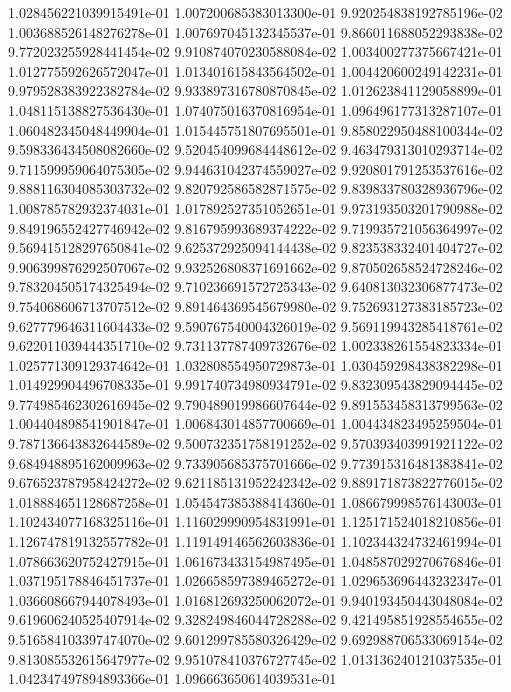 1.028456221039915491e-01
1.007200685383013300e-01
9.920254838192785196e-02
1.003688526148276278e-01
1.007697045132345537e-01
9.866011688052293838e-02
9.772023255928441454e-02
9.910874070230588084e-02
1.003400277375667421e-01
1.012775592626572047e-01
1.013401615843564502e-01
1.004420600249142231e-01
9.979528383922382784e-02
9.933897316780870845e-02
1.012623841129058899e-01
1.048115138827536430e-01
1.074075016370816954e-01
1.096496177313287107e-01
1.060482345048449904e-01
1.015445751807695501e-01
9.858022950488100344e-02
9.598336434508082660e-02
9.520454099684448612e-02
9.463479313010293714e-02
9.711599959064075305e-02
9.944631042374559027e-02
9.920801791253537616e-02
9.888116304085303732e-02
9.820792586582871575e-02
9.839833780328936796e-02
1.008785782932374031e-01
1.017892527351052651e-01
9.973193503201790988e-02
9.849196552427746942e-02
9.816795993689374222e-02
9.719935721056364997e-02
9.569415128297650841e-02
9.625372925094144438e-02
9.823538332401404727e-02
9.906399876292507067e-02
9.932526808371691662e-02
9.870502658524728246e-02
9.783204505174325494e-02
9.710236691572725343e-02
9.640813032306877473e-02
9.754068606713707512e-02
9.891464369545679980e-02
9.752693127383185723e-02
9.627779646311604433e-02
9.590767540004326019e-02
9.569119943285418761e-02
9.622011039444351710e-02
9.731137787409732676e-02
1.002338261554823334e-01
1.025771309129374642e-01
1.032808554950729873e-01
1.030459298438382298e-01
1.014929904496708335e-01
9.991740734980934791e-02
9.832309543829094445e-02
9.774985462302616945e-02
9.790489019986607644e-02
9.891553458313799563e-02
1.004404898541901847e-01
1.006843014857700669e-01
1.004434823495259504e-01
9.787136643832644589e-02
9.500732351758191252e-02
9.570393403991921122e-02
9.684948895162009963e-02
9.733905685375701666e-02
9.773915316481383841e-02
9.676523787958424272e-02
9.621185131952242342e-02
9.889171873822776015e-02
1.018884651128687258e-01
1.054547385388414360e-01
1.086679998576143003e-01
1.102434077168325116e-01
1.116029990954831991e-01
1.125171524018210856e-01
1.126747819132557782e-01
1.119149146562603836e-01
1.102344324732461994e-01
1.078663620752427915e-01
1.061673433154987495e-01
1.048587029270676846e-01
1.037195178846451737e-01
1.026658597389465272e-01
1.029653696443232347e-01
1.036608667944078493e-01
1.016812693250062072e-01
9.940193450443048084e-02
9.619606240525407914e-02
9.328249846044728288e-02
9.421495851928554655e-02
9.516584103397474070e-02
9.601299785580326429e-02
9.692988706533069154e-02
9.813085532615647977e-02
9.951078410376727745e-02
1.013136240121037535e-01
1.042347497894893366e-01
1.096663650614039531e-01
